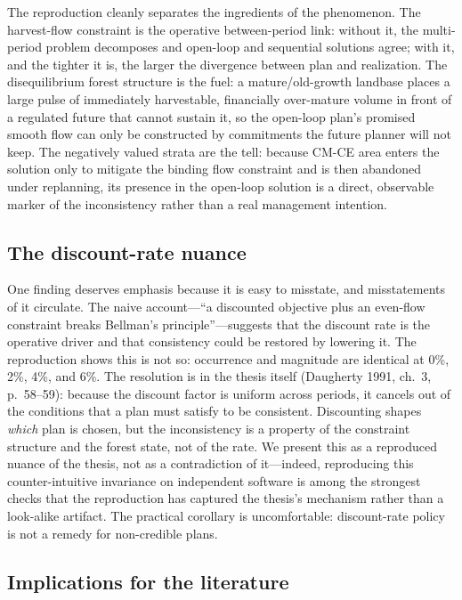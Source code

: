 \documentclass[12pt]{article}
\begin{document}
The reproduction cleanly separates the ingredients of the phenomenon. The harvest-flow constraint is the operative between-period link: without it, the multi-period problem decomposes and open-loop and sequential solutions agree; with it, and the tighter it is, the larger the divergence between plan and realization. The disequilibrium forest structure is the fuel: a mature/old-growth landbase places a large pulse of immediately harvestable, financially over-mature volume in front of a regulated future that cannot sustain it, so the open-loop plan's promised smooth flow can only be constructed by commitments the future planner will not keep. The negatively valued strata are the tell: because CM-CE area enters the solution only to mitigate the binding flow constraint and is then abandoned under replanning, its presence in the open-loop solution is a direct, observable marker of the inconsistency rather than a real management intention.

\hypertarget{the-discount-rate-nuance}{%
\subsection{The discount-rate nuance}\label{the-discount-rate-nuance}}

One finding deserves emphasis because it is easy to misstate, and misstatements of it circulate. The naive account---``a discounted objective plus an even-flow constraint breaks Bellman's principle''---suggests that the discount rate is the operative driver and that consistency could be restored by lowering it. The reproduction shows this is not so: occurrence and magnitude are identical at 0\%, 2\%, 4\%, and 6\%. The resolution is in the thesis itself (Daugherty 1991, ch.~3, p.~58--59): because the discount factor is uniform across periods, it cancels out of the conditions that a plan must satisfy to be consistent. Discounting shapes \emph{which} plan is chosen, but the inconsistency is a property of the constraint structure and the forest state, not of the rate. We present this as a reproduced nuance of the thesis, not as a contradiction of it---indeed, reproducing this counter-intuitive invariance on independent software is among the strongest checks that the reproduction has captured the thesis's mechanism rather than a look-alike artifact. The practical corollary is uncomfortable: discount-rate policy is not a remedy for non-credible plans.

\hypertarget{implications-for-the-literature}{%
\subsection{Implications for the literature}\label{implications-for-the-literature}}
\end{document}
